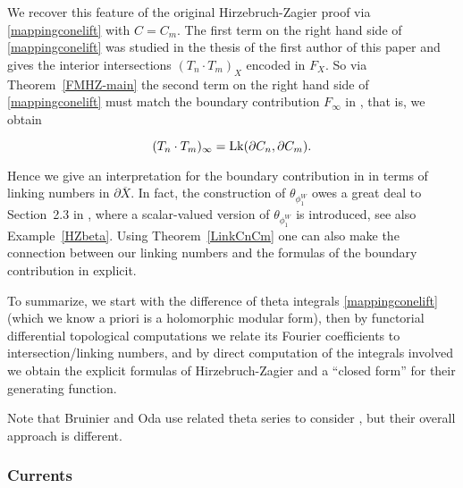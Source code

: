 We recover this feature of the original Hirzebruch-Zagier proof via
\eqref{mappingconelift} with $C=C_m$. The first term on the right
hand side of \eqref{mappingconelift} was studied in the thesis of
the first author of this paper \cite{FCompo} and gives the interior
intersections $(T_n \cdot T_m)_X$ encoded in $F_X$. So via
Theorem~\ref{FMHZ-main} the second term on the right hand side of
\eqref{mappingconelift} must match the boundary contribution
$F_{\infty}$ in \cite{HZ}, that is, we obtain
\begin{theorem}
\[
({T}_n \cdot {T}_m)_{\infty} = \operatorname{Lk}( \partial C_n, \partial C_m).
\]
\end{theorem}
Hence we give an interpretation for the boundary contribution in
\cite{HZ} in terms of linking numbers in $\partial \overline{X}$.
In fact, the construction of $\theta_{\phi_1^W}$ owes a great deal
to Section~2.3 in \cite{HZ}, where a scalar-valued version of
$\theta_{\phi_1^W}$ is introduced, see also Example~\ref{HZbeta}.
Using Theorem~\ref{LinkCnCm} one can also make the connection between
our linking numbers and the formulas of the boundary contribution
in \cite{HZ} explicit.

To summarize, we start with the difference of theta integrals
\eqref{mappingconelift} (which we know a priori is a holomorphic
modular form), then by functorial differential topological computations
we relate its Fourier coefficients to intersection/linking numbers,
and by direct computation of the integrals involved we obtain the
explicit formulas of Hirzebruch-Zagier and a ``closed form'' for
their generating function.

Note that Bruinier \cite{B-123} and Oda \cite{Oda} use related theta
series to consider \cite{HZ}, but their overall approach is different.


\subsubsection*{Currents}

